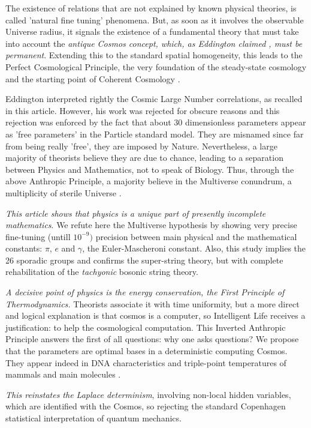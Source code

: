 \documentclass[twoside,draft]{article}
\begin{document}
\begin{sloppypar}
The existence of relations that are not explained by known physical theories, is called 'natural fine tuning' phenomena. But, as soon as it involves the observable Universe radius, it signals the existence of a fundamental theory that must take into account the \textit{antique Cosmos concept, which, as Eddington claimed \cite{Eddington}, must be permanent}. Extending this to the standard spatial homogeneity, this leads to the Perfect Cosmological Principle, the very foundation of the steady-state cosmology and the starting point of Coherent Cosmology \cite{Sanchez1}.

Eddington interpreted rightly the Cosmic Large Number correlations, as recalled in this article. However, his work was rejected for obscure reasons and this rejection was enforced by the fact that about 30 dimensionless parameters appear as 'free parameters' in the Particle standard model. They are misnamed since far from being really 'free', they are imposed by Nature. Nevertheless, a large majority of theorists believe they are due to chance, leading to a separation between Physics and Mathematics, not to speak of Biology. Thus, through the above Anthropic Principle, a majority believe in the Multiverse conundrum, a multiplicity of sterile Universe \cite{Carr}.

\textit{This article shows that physics is a unique part of presently incomplete mathematics}. We refute here the Multiverse hypothesis by showing very precise fine-tuning (untill $10^{-9})$ precision between main physical and the mathematical constants: $\pi$, $e$ and $\gamma$, the Euler-Mascheroni constant. Also, this study implies the 26 sporadic groups and confirms the super-string theory, but with complete rehabilitation of the \textit{tachyonic} bosonic string theory.

\textit{A decisive point of physics is the energy conservation, the First Principle of Thermodynamics.} Theorists associate it with time uniformity, but a more direct and logical explanation is that cosmos is a computer, so Intelligent Life receives a justification: to help the cosmological computation. This Inverted Anthropic Principle answers the first of all questions: why one asks questions? We propose that the parameters are optimal bases in a deterministic computing Cosmos. They appear indeed in DNA characteristics and triple-point temperatures of mammals and main molecules \cite{Sanchez1}.

\textit{This reinstates the Laplace determinism}, involving non-local hidden variables, which are identified with the Cosmos, so rejecting the standard Copenhagen statistical interpretation of quantum mechanics.


\end{sloppypar}
\end{document}
